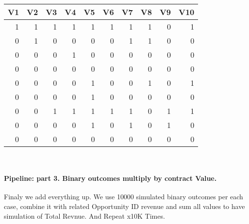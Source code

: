 \documentclass[]{article}
\let\oldparagraph\paragraph
\renewcommand{\paragraph}[1]{\oldparagraph{#1}\mbox{}}
\begin{document}
\begin{tabular}{r|r|r|r|r|r|r|r|r|r}
\hline
V1 & V2 & V3 & V4 & V5 & V6 & V7 & V8 & V9 & V10\\
\hline
1 & 1 & 1 & 1 & 1 & 1 & 1 & 1 & 0 & 1\\
\hline
0 & 1 & 0 & 0 & 0 & 0 & 1 & 1 & 0 & 0\\
\hline
0 & 0 & 0 & 1 & 0 & 0 & 0 & 0 & 0 & 0\\
\hline
0 & 0 & 0 & 0 & 0 & 0 & 0 & 0 & 0 & 0\\
\hline
0 & 0 & 0 & 0 & 1 & 0 & 0 & 1 & 0 & 1\\
\hline
0 & 0 & 0 & 0 & 1 & 0 & 0 & 0 & 0 & 0\\
\hline
0 & 0 & 1 & 1 & 1 & 1 & 1 & 0 & 1 & 1\\
\hline
0 & 0 & 0 & 0 & 1 & 0 & 1 & 0 & 1 & 0\\
\hline
0 & 0 & 0 & 0 & 0 & 0 & 0 & 0 & 0 & 0\\
\hline
\end{tabular}

~

\hypertarget{pipeline-part-3.-binary-outcomes-multiply-by-contract-value.}{%
\paragraph{Pipeline: part 3. Binary outcomes multiply by contract
Value.}\label{pipeline-part-3.-binary-outcomes-multiply-by-contract-value.}}

Finaly we add everything up. We use 10000 simulated binary outcomes per
each case, combine it with related Opportunity ID revenue and sum all
values to have simulation of Total Revnue. And Repeat x10K Times.
\end{document}
